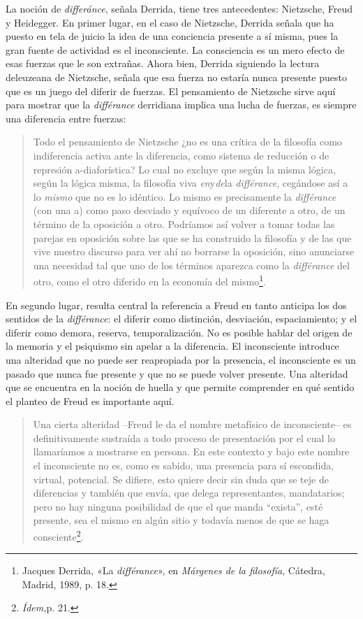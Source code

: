 La noción de \emph{differánce}, señala Derrida, tiene tres antecedentes: Nietzsche, Freud y Heidegger. En primer lugar, en el caso de Nietzsche, Derrida señala que ha puesto en tela de juicio la idea de una conciencia presente a sí misma, pues la gran fuente de actividad es el inconsciente. La consciencia es un mero efecto de esas fuerzas que le son extrañas. Ahora bien, Derrida siguiendo la lectura deleuzeana de Nietzsche, señala que esa fuerza no estaría nunca presente puesto que es un juego del diferir de fuerzas. El pensamiento de Nietzsche sirve aquí para mostrar que la \emph{différance} derridiana implica una lucha de fuerzas, es siempre una diferencia entre fuerzas:

\begin{quote}
Todo el pensamiento de Nietzsche ¿no es una crítica de la filosofía como indiferencia activa ante la diferencia, como sistema de reducción o de represión a-diaforística? Lo cual no excluye que según la misma lógica, según la lógica misma, la filosofía viva \emph{en}y\emph{de}la \emph{différance}, cegándose así a lo \emph{mismo} que no es lo idéntico. Lo mismo es precisamente la \emph{différance} (con una a) como paso desviado y equívoco de un diferente a otro, de un término de la oposición a otro. Podríamos así volver a tomar todas las parejas en oposición sobre las que se ha construido la filosofía y de las que vive nuestro discurso para ver ahí no borrarse la oposición, sino anunciarse una necesidad tal que uno de los términos aparezca como la \emph{différance} del otro, como el otro diferido en la economía del mismo\footnote{Jacques Derrida, «La \emph{différance}», en \emph{Márgenes de la filosofía}, Cátedra, Madrid, 1989, p. 18.}.
\end{quote}

En segundo lugar, resulta central la referencia a Freud en tanto anticipa los dos sentidos de la \emph{différance}: el diferir como distinción, desviación, espaciamiento; y el diferir como demora, reserva, temporalización. No es posible hablar del origen de la memoria y el psiquismo sin apelar a la diferencia. El inconsciente introduce una alteridad que no puede ser reapropiada por la presencia, el inconsciente es un pasado que nunca fue presente y que no se puede volver presente. Una alteridad que se encuentra en la noción de huella y que permite comprender en qué sentido el planteo de Freud es importante aquí.

\begin{quote}
Una cierta alteridad --Freud le da el nombre metafísico de inconsciente-- es definitivamente sustraída a todo proceso de presentación por el cual lo llamaríamos a mostrarse en persona. En este contexto y bajo este nombre el inconsciente no es, como es sabido, una presencia para sí escondida, virtual, potencial. Se difiere, esto quiere decir sin duda que se teje de diferencias y también que envía, que delega representantes, mandatarios; pero no hay ninguna posibilidad de que el que manda ``exista'', esté presente, sea el mismo en algún sitio y todavía menos de que se haga consciente\footnote{\emph{Ídem,}p. 21.}.
\end{quote}

